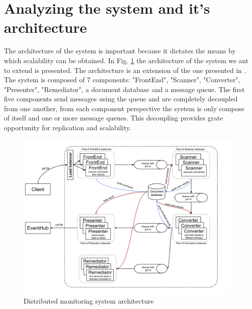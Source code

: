 \section{Analyzing the system and it's architecture}
The architecture of the system is important because it dictates the means by which scalability can be obtained. In Fig. \ref{fig:systemArchitecture} the architecture of the system we ant to extend is presented. The architecture is an extension of the one presented in \cite{IrimieAndPetcu}. The system is composed of 7 components: "FrontEnd", "Scanner", "Converter", "Presenter", "Remediator", a document database and a message queue. The first five components send messages using the queue and are completely decoupled from one another, from each component perspective the system is only compose of itself and one or more message queues. This decoupling provides grate opportunity for replication and scalability.

\begin{figure}[ht]
\centering
\includegraphics[width=\linewidth]{./img/MonitoringSystemArchitectureRemediation.png}
\caption{Distributed monitoring system architecture}
\label{fig:systemArchitecture}
\end{figure}

